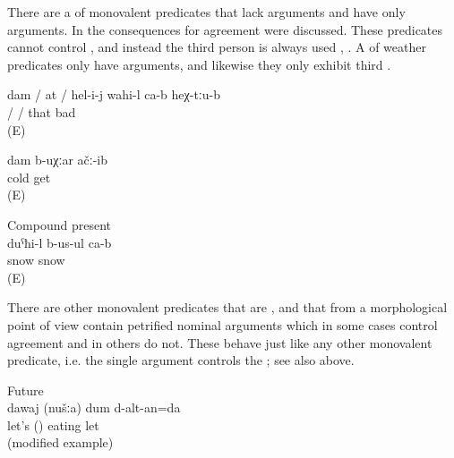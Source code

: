 There are a  of monovalent predicates that lack  arguments and have only  arguments. In  the consequences for  agreement were discussed. These predicates cannot control , and instead the third person is always used , . A  of weather predicates only have  arguments, and likewise they only exhibit third  .
%
\begin{exe}
	\ex	\label{ex:I / you / she /	he feel(s) bad there}
	\gll	dam	/	at	/ hel-i-j	wahi-l	ca-b	heχ-tːu-b\\
			/		/	that	bad		\\
	\glt	{} (E)

	\ex	\label{ex:‎‎‎I got cold agreement}
	\gll	dam	b-uχːar	ačː-ib\\
			cold	get\\
	\glt	{} (E)

	\ex	Compound present\\	\label{ex:It is snowing compound present}
	\gll	duˁħi-l	b-us-ul	ca-b\\
		snow	snow	\\
	\glt	{} (E)
\end{exe}

There are other monovalent predicates that are , and that from a morphological point of view contain petrified nominal arguments which in some cases control  agreement and in others do not. These behave just like any other monovalent predicate, i.e. the single argument controls the  ; see also  above.
%
\begin{exe}
	\ex	Future\\	\label{ex:‎‎Come on, we will eat future}
	\gll	dawaj		(nušːa)	dum	d-alt-an=da\\
		let's		()	eating	let\\
	\glt	{} (modified example)
\end{exe}

